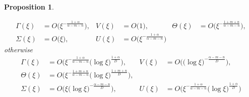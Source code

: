 \documentclass[11pt]{article}
\def\BO{{{O}}}
\newtheorem{proposition}{Proposition}[section]
\theoremstyle{remark}
\begin{document}
\begin{proposition}
\begin{enumerate}
  \begin{equation} \label{eq:ss_asymp1}
  \begin{aligned}
    \Gamma(\xi) &= \BO\big(\xi^{-\frac{1+\alpha}{\alpha-m-n}}), & V(\xi) &= \BO\big(1), &    \Theta(\xi) &= \BO\big(\xi^{-\frac{1+m+n}{\alpha-m-n}}),\\
   \Sigma(\xi) &= \BO\big(\xi), &   U(\xi) &= \BO\big(\xi^{-\frac{1+\alpha}{\alpha-m-n}})
  \end{aligned}
  \end{equation}
  otherwise
    \begin{equation} \label{eq:ss_asymp2}
  \begin{aligned}
    \Gamma(\xi) &= \BO\big(\xi^{-\frac{1+\alpha}{\alpha-m-n}}\big(\log\xi\big)^{\frac{1+\alpha}{D}}\big), & V(\xi) &= \BO\big(\big(\log\xi\big)^{-\frac{\alpha-m-n}{D}}\big),
    \\
        \Theta(\xi) &= \BO\big(\xi^{-\frac{1+m+n}{\alpha-m-n}}\big(\log\xi\big)^{\frac{1+m+n}{D}}\big),\\
   \Sigma(\xi) &= \BO\big(\xi\big(\log\xi\big)^{-\frac{\alpha-m-n}{D}}\big), &   U(\xi) &= \BO\big(\xi^{-\frac{1+\alpha}{\alpha-m-n}}\big(\log\xi\big)^{\frac{1+\alpha}{D}}\big)
  \end{aligned}
  \end{equation}
 \end{enumerate}
\end{proposition}
\end{document}
